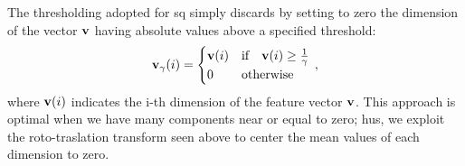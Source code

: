 The thresholding adopted for \gls{sq} simply discards by setting to zero the dimension of the vector $\mathbf{v}$ having absolute values above a specified threshold:
\begin{equation}
\mathbf{v}_{\gamma} (i) = \begin{cases}
                    \mathbf{v} (i) & \text{if} \quad \mathbf{v} (i) \geq \frac{1}{\gamma} \\
                    0      & \text{otherwise}
                  \end{cases} \,,
\end{equation}
where $\mathbf{v}(i)$ indicates the i-th dimension of the feature vector $\mathbf{v}$.
This approach is optimal when we have many components near or equal to zero;
hus, we exploit the roto-traslation transform seen above to center the mean values of each dimension to zero.




